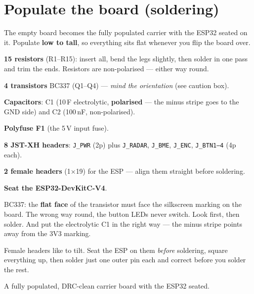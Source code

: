 \section{Populate the board (soldering)}
\begin{ziel}
The empty board becomes the fully populated carrier with the ESP32 seated on it. Populate
\textbf{low to tall}, so everything sits flat whenever you flip the board over.
\end{ziel}
\begin{schritte}
  \item \textbf{15 resistors} (R1–R15): insert all, bend the legs slightly, then solder in
        one pass and trim the ends. Resistors are non-polarised — either way round.
  \item \textbf{4 transistors} BC337 (Q1–Q4) — \emph{mind the orientation} (see caution box).
  \item \textbf{Capacitors}: C1 (10\,\textmu F electrolytic, \textbf{polarised} — the minus
        stripe goes to the GND side) and C2 (100\,nF, non-polarised).
  \item \textbf{Polyfuse F1} (the 5\,V input fuse).
  \item \textbf{8 JST-XH headers}: \texttt{J\_PWR} (2p) plus \texttt{J\_RADAR},
        \texttt{J\_BME}, \texttt{J\_ENC}, \texttt{J\_BTN1--4} (4p each).
  \item \textbf{2 female headers} (1×19) for the ESP — align them straight before soldering.
  \item \textbf{Seat the ESP32-DevKitC-V4}.
\end{schritte}
\begin{achtung}
BC337: the \textbf{flat face} of the transistor must face the silkscreen marking on the
board. The wrong way round, the button LEDs never switch. Look first, then solder. And put
the electrolytic C1 in the right way — the minus stripe points away from the 3V3 marking.
\end{achtung}
\begin{tipp}
Female headers like to tilt. Seat the ESP on them \emph{before} soldering, square everything
up, then solder just one outer pin each and correct before you solder the rest.
\end{tipp}
\begin{ergebnis}
A fully populated, DRC-clean carrier board with the ESP32 seated.
\end{ergebnis}

